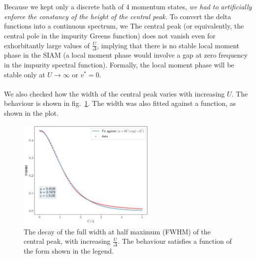 \documentclass{article}
\numberwithin{equation}{section}
\begin{document}
\\\\
Because we kept only a discrete bath of 4 momentum states, \textit{we had to artificially enforce the constancy of the height of the central peak.} To convert the delta functions into a continuous spectrum, we  The central peak (or equivalently, the central pole in the impurity Greens function) does not vanish even for exhorbitantly large values of \(\frac{U}{\Delta}\), implying that there is no stable local moment phase in the SIAM (a local moment phase would involve a gap at zero frequency in the impurity spectral function). Formally, the local moment phase will be stable only at \(U \to \infty\) or \(v^* = 0\).
\\\\
We also checked how the width of the central peak varies with increasing \(U\). The behaviour is shown in fig.~\ref{fwhm}. The width was also fitted against a function, as shown in the plot.
\begin{figure}[htpb]
	\centering
	\includegraphics[width=0.6\textwidth]{./width_vs_U_simple_fit.pdf}
	\caption{The decay of the full width at half maximum (FWHM) of the central peak, with increasing \(\frac{U}{\Delta}\). The behaviour satisfies a function of the form shown in the legend.}
	\label{fwhm}
\end{figure}
\end{document}
